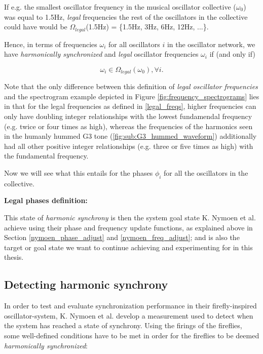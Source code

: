 If e.g. the smallest oscillator frequency in the musical oscillator collective ($\omega_0$) was equal to 1.5Hz, \textit{legal} frequencies the rest of the oscillators in the collective could have would be $\Omega_{legal}$(1.5Hz) = \{1.5Hz, 3Hz, 6Hz, 12Hz, ...\}.

Hence, in terms of frequencies $\omega_i$ for all oscillators $i$ in the oscillator network, we have \textit{harmonically synchronized} and \textit{legal} oscillator frequencies $\omega_i$ if (and only if)

\begin{equation}\label{synced_freqs}
\omega_i \in \Omega_{legal}(\omega_0) , \forall i.
\end{equation} \nl

Note that the only difference between this definition of \textit{legal oscillator frequencies} and the spectrogram example depicted in Figure \ref{fig:frequency_spectrograms} lies in that for the legal frequencies as defined in \eqref{legal_freqs}, higher frequencies can only have doubling integer relationships with the lowest fundamendal frequency (e.g. twice or four times as high), whereas the frequencies of the harmonics seen in the humanly hummed G3 tone (\ref{fig:sub:G3_hummed_waveform}) additionally had all other positive integer relationships (e.g. three or five times as high) with the fundamental frequency.

Now we will see what this entails for the phases $\phi_i$ for all the oscillators in the collective. \nl

\textbf{Legal phases definition:} \nl

 \nl

This state of \textit{harmonic synchrony} is then the system goal state K. Nymoen et al. achieve using their phase and frequency update functions, as explained above in Section \ref{nymoen_phase_adjust} and \ref{nymoen_freq_adjust}; and is also the target or goal state we want to continue achieving and experimenting for in this thesis.


	\subsection{Detecting harmonic synchrony}
	\label{subsec:harmonic_synchrony}
	In order to test and evaluate synchronization performance in their firefly-inspired oscillator-system, K. Nymoen et al. \cite{nymoen_synch} develop a measurement used to detect when the system has reached a state of synchrony. Using the firings of the fireflies, some well-defined conditions have to be met in order for the fireflies to be deemed \textit{harmonically synchronized}: \nl
	
